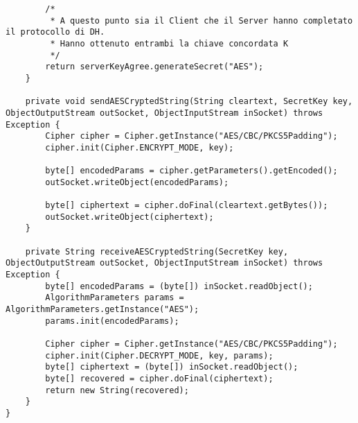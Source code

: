\documentclass[12pt]{article}
\begin{document}
\begin{lstlisting}
		/*
		 * A questo punto sia il Client che il Server hanno completato il protocollo di DH.
		 * Hanno ottenuto entrambi la chiave concordata K
		 */
		return serverKeyAgree.generateSecret("AES");
	}

	private void sendAESCryptedString(String cleartext, SecretKey key, ObjectOutputStream outSocket, ObjectInputStream inSocket) throws Exception {
		Cipher cipher = Cipher.getInstance("AES/CBC/PKCS5Padding");
		cipher.init(Cipher.ENCRYPT_MODE, key);

		byte[] encodedParams = cipher.getParameters().getEncoded();
		outSocket.writeObject(encodedParams);

		byte[] ciphertext = cipher.doFinal(cleartext.getBytes());
		outSocket.writeObject(ciphertext);
	}

	private String receiveAESCryptedString(SecretKey key, ObjectOutputStream outSocket, ObjectInputStream inSocket) throws Exception {
		byte[] encodedParams = (byte[]) inSocket.readObject();
		AlgorithmParameters params = AlgorithmParameters.getInstance("AES");
		params.init(encodedParams);

		Cipher cipher = Cipher.getInstance("AES/CBC/PKCS5Padding");
		cipher.init(Cipher.DECRYPT_MODE, key, params);
		byte[] ciphertext = (byte[]) inSocket.readObject();
		byte[] recovered = cipher.doFinal(ciphertext);
		return new String(recovered);
	}
}

\end{lstlisting}
\end{document}
